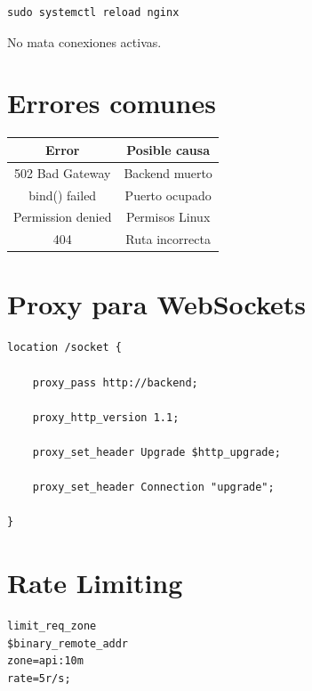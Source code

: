 \documentclass[a4paper,11pt]{article}
\begin{document}
\begin{lstlisting}
sudo systemctl reload nginx
\end{lstlisting}

No mata conexiones activas.


\section*{Errores comunes}

\begin{center}
\begin{tabular}{| c | c |}
\hline
Error & Posible causa \\
\hline\hline
502 Bad Gateway & Backend muerto \\
\hline
bind() failed & Puerto ocupado \\
\hline
Permission denied & Permisos Linux \\
\hline
404 & Ruta incorrecta \\
\hline
\end{tabular}
\end{center}


\section*{Proxy para WebSockets}

\begin{lstlisting}
location /socket {

    proxy_pass http://backend;

    proxy_http_version 1.1;

    proxy_set_header Upgrade $http_upgrade;

    proxy_set_header Connection "upgrade";

}
\end{lstlisting}


\section*{Rate Limiting}

\begin{lstlisting}
limit_req_zone
$binary_remote_addr
zone=api:10m
rate=5r/s;
\end{lstlisting}
\end{document}
